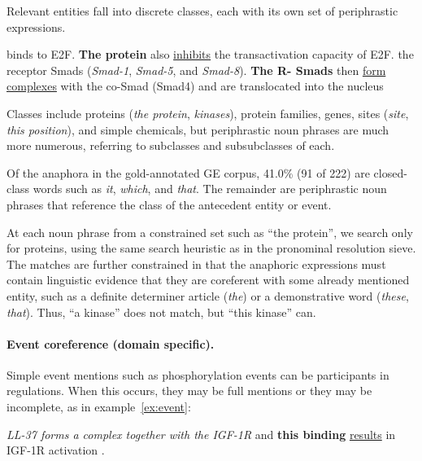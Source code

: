 Relevant entities fall into discrete classes, each with its own set of periphrastic expressions.

\begin{exe}
	\ex\label{ex:protein}  binds to E2F. {\bf The protein} also \underline{inhibits} the 
transactivation capacity of E2F.
	\ex\label{ex:rsmad} \textellipsis the receptor Smads ({\it Smad-1}, {\it Smad-5}, and {\it Smad-8}). {\bf The R-
Smads} then \underline{form complexes} with the co-Smad (Smad4) and are translocated into the nucleus\textellipsis
\end{exe}

Classes include proteins ({\it the protein}, {\it kinases}), protein families, genes, sites ({\it site}, {\it this position}), and 
simple chemicals, but periphrastic noun phrases are much more numerous, referring to subclasses and 
subsubclasses of each. 

Of the anaphora in the gold-annotated GE corpus, 41.0\% (91 of 222) are closed-class words such as {\it it}, {\it 
which}, and {\it that}. The remainder are periphrastic noun phrases that reference the 
class of the antecedent entity or event.

At each noun phrase from a constrained set such as ``the protein'', we search only for proteins, using the same search heuristic as in the pronominal resolution sieve. The matches are further constrained in that the anaphoric expressions must contain linguistic evidence that they are coreferent with some already mentioned entity, such as a definite determiner article ({\it the}) or a demonstrative word ({\it these}, {\it that}). Thus, ``a kinase'' does not match, but ``this kinase'' can.

\paragraph{Event coreference (domain specific).}

Simple event mentions such as phosphorylation events can be participants in regulations. When this occurs, they may be full mentions or they may be incomplete, as in example~\ref{ex:event}:

\begin{exe}
	\ex\label{ex:event} {\it LL-37 forms a complex together with the IGF-1R} \textellipsis and {\bf this binding} \underline{results} in IGF-1R activation \textellipsis .
\end{exe}

